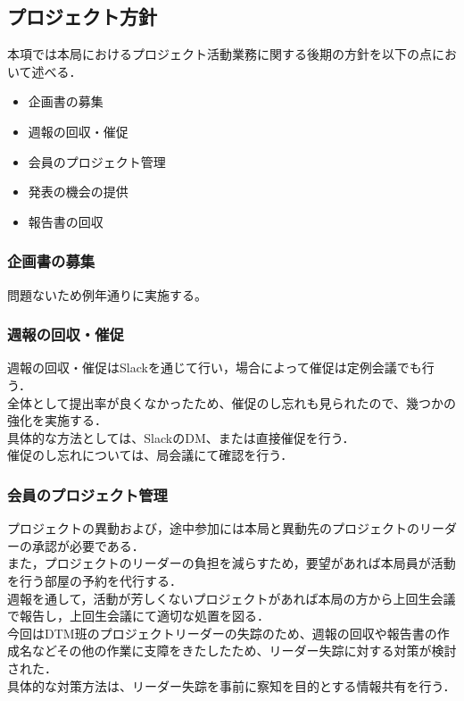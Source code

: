 ﻿\subsection*{プロジェクト方針}


本項では本局におけるプロジェクト活動業務に関する後期の方針を以下の点において述べる．

\begin{itemize}
\item 企画書の募集
\item 週報の回収・催促
\item 会員のプロジェクト管理
\item 発表の機会の提供
\item 報告書の回収
\end{itemize}

\subsubsection*{企画書の募集}

問題ないため例年通りに実施する。

\subsubsection*{週報の回収・催促}

週報の回収・催促はSlackを通じて行い，場合によって催促は定例会議でも行う．\\
全体として提出率が良くなかったため、催促のし忘れも見られたので、幾つかの強化を実施する．\\
具体的な方法としては、SlackのDM、または直接催促を行う．\\
催促のし忘れについては、局会議にて確認を行う．\\


\subsubsection*{会員のプロジェクト管理}

プロジェクトの異動および，途中参加には本局と異動先のプロジェクトのリーダーの承認が必要である．\\
また，プロジェクトのリーダーの負担を減らすため，要望があれば本局員が活動を行う部屋の予約を代行する．\\
週報を通して，活動が芳しくないプロジェクトがあれば本局の方から上回生会議で報告し，上回生会議にて適切な処置を図る．\\
今回はDTM班のプロジェクトリーダーの失踪のため、週報の回収や報告書の作成名などその他の作業に支障をきたしたため、リーダー失踪に対する対策が検討された．\\
具体的な対策方法は、リーダー失踪を事前に察知を目的とする情報共有を行う．\\

